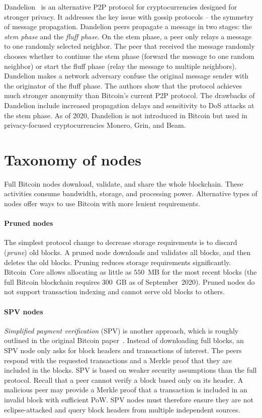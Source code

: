 Dandelion~\cite{Venkatakrishnan2017, Fanti2018} is an alternative P2P protocol for cryptocurrencies designed for stronger privacy.
It addresses the key issue with gossip protocols -- the symmetry of message propagation.
Dandelion peers propagate a message in two stages: the \textit{stem phase} and the \textit{fluff phase}.
On the stem phase, a peer only relays a message to one randomly selected neighbor.
The peer that received the message randomly chooses whether to continue the stem phase (forward the message to one random neighbor) or start the fluff phase (relay the message to multiple neighbors).
Dandelion makes a network adversary confuse the original message sender with the originator of the fluff phase.
The authors show that the protocol achieves much stronger anonymity than Bitcoin's current P2P protocol.
The drawbacks of Dandelion include increased propagation delays and sensitivity to DoS attacks at the stem phase.
As of 2020, Dandelion is not introduced in Bitcoin but used in privacy-focused cryptocurrencies Monero, Grin, and Beam.


\section{Taxonomy of nodes}
\label{sec:TaxonomyOfNodes}

Full Bitcoin nodes download, validate, and share the whole blockchain.
These activities consume bandwidth, storage, and processing power.
Alternative types of nodes offer ways to use Bitcoin with more lenient requirements.

\paragraph{Pruned nodes}
The simplest protocol change to decrease storage requirements is to discard (\textit{prune}) old blocks.
A pruned node downloads and validates all blocks, and then deletes the old blocks.
Pruning reduces storage requirements significantly.
Bitcoin~Core allows allocating as little as $550$~MB for the most recent blocks (the full Bitcoin blockchain requires $300$~GB as of September~2020).
Pruned nodes do not support transaction indexing and cannot serve old blocks to others.

\paragraph{SPV nodes}
\textit{Simplified payment verification} (SPV) is another approach, which is roughly outlined in the original Bitcoin paper~\cite{Nakamoto2008}.
Instead of downloading full blocks, an SPV node only asks for block headers and transactions of interest.
The peers respond with the requested transactions and a Merkle proof that they are included in the blocks.
SPV is based on weaker security assumptions than the full protocol.
Recall that a peer cannot verify a block based only on its header.
A malicious peer may provide a Merkle proof that a transaction is included in an invalid block with sufficient PoW.
SPV nodes must therefore ensure they are not eclipse-attacked and query block headers from multiple independent sources.

